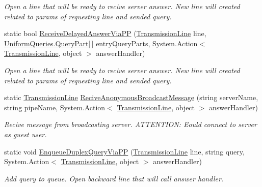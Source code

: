 \begin{DoxyCompactItemize}
\begin{DoxyCompactList}\small\item\em Open a line that will be ready to recive server answer. New line will created related to params of requesting line and sended query. \end{DoxyCompactList}\item 
static bool \mbox{\hyperlink{class_uniform_client_1_1_base_client_a4db768d7c09862ab9adc9d7b0638edc6}{Receive\+Delayed\+Answer\+Via\+PP}} (\mbox{\hyperlink{class_pipes_provider_1_1_client_1_1_transmission_line}{Transmission\+Line}} line, \mbox{\hyperlink{struct_uniform_queries_1_1_query_part}{Uniform\+Queries.\+Query\+Part}}\mbox{[}$\,$\mbox{]} entry\+Query\+Parts, System.\+Action$<$ \mbox{\hyperlink{class_pipes_provider_1_1_client_1_1_transmission_line}{Transmission\+Line}}, object $>$ answer\+Handler)
\begin{DoxyCompactList}\small\item\em Open a line that will be ready to recive server answer. New line will created related to params of requesting line and sended query. \end{DoxyCompactList}\item 
static \mbox{\hyperlink{class_pipes_provider_1_1_client_1_1_transmission_line}{Transmission\+Line}} \mbox{\hyperlink{class_uniform_client_1_1_base_client_a97a86c4f5931d39e09ce7c9d336a1636}{Recive\+Anonymous\+Broadcast\+Message}} (string server\+Name, string pipe\+Name, System.\+Action$<$ \mbox{\hyperlink{class_pipes_provider_1_1_client_1_1_transmission_line}{Transmission\+Line}}, object $>$ answer\+Handler)
\begin{DoxyCompactList}\small\item\em Recive message from broadcasting server. A\+T\+T\+E\+N\+T\+I\+ON\+: Eould connect to server as guest user. \end{DoxyCompactList}\item 
static void \mbox{\hyperlink{class_uniform_client_1_1_base_client_a964bd521f46fd99f64b10257c5d233ef}{Enqueue\+Duplex\+Query\+Via\+PP}} (\mbox{\hyperlink{class_pipes_provider_1_1_client_1_1_transmission_line}{Transmission\+Line}} line, string query, System.\+Action$<$ \mbox{\hyperlink{class_pipes_provider_1_1_client_1_1_transmission_line}{Transmission\+Line}}, object $>$ answer\+Handler)
\begin{DoxyCompactList}\small\item\em Add query to queue. Open backward line that will call answer handler. \end{DoxyCompactList}\item 

\end{DoxyCompactItemize}

